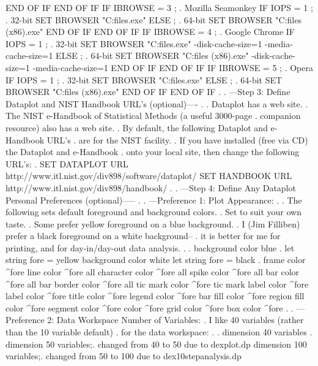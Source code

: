   END OF IF
END OF IF
IF IBROWSE = 3  ; . Mozilla Seamonkey
   IF IOPS = 1  ; . 32-bit
     SET BROWSER "C:\program files\SeaMonkey\seamonkey.exe"
   ELSE         ; . 64-bit
     SET BROWSER "C:\program files (x86)\SeaMonkey\seamonkey.exe"
   END OF IF
END OF IF
IF IBROWSE = 4  ; . Google Chrome
   IF IOPS = 1  ; . 32-bit
     SET BROWSER "C:\program files\Google\Chrome\Application\chrome.exe" -disk-cache-size=1 -media-cache-size=1
   ELSE         ; . 64-bit
     SET BROWSER "C:\program files (x86)\Google\Chrome\Application\chrome.exe" -disk-cache-size=1 -media-cache-size=1
   END OF IF
END OF IF
IF IBROWSE = 5  ; . Opera
   IF IOPS = 1  ; . 32-bit
     SET BROWSER "C:\program files\Opera\opera.exe"
   ELSE         ; . 64-bit
     SET BROWSER "C:\program files (x86)\Opera\opera.exe"
   END OF IF
END OF IF
.
. ---Step 3: Define Dataplot and NIST Handbook URL's (optional)----
.
. Dataplot has a web site.
. The NIST e-Handbook of Statistical Methods (a useful 3000-page
. companion resource) also has a web site.
. By default, the following Dataplot and e-Handbook URL's
. are for the NIST facility.
. If you have installed (free via CD) the Dataplot and e-Handbook
. onto your local site, then change the following URL's:
.
SET DATAPLOT URL http://www.itl.nist.gov/div898/software/dataplot/
SET HANDBOOK URL http://www.itl.nist.gov/div898/handbook/
.
. ---Step 4: Define Any Dataplot Personal Preferences (optional)-----
.
. ---Preference 1: Plot Appearance:
.
. The following sets default foreground and background colors.
. Set to suit your own taste.
. Some prefer yellow foreground on a blue background.
. I (Jim Filliben) prefer a black foreground on a white background--
. it is better for me for printing, and for day-in/day-out data analysis.
.
     . background color blue
     . let string fore = yellow
     background color white
     let string fore = black
     .
     frame color ^fore
     line color ^fore all
     character color ^fore all
     spike color ^fore all
     bar color ^fore all
     bar border color ^fore all
     tic mark color ^fore
     tic mark label color ^fore
     label color ^fore
     title color ^fore
     legend color ^fore
     bar fill color ^fore
     region fill color ^fore
     segment color ^fore
     color ^fore
     grid color ^fore
     box color ^fore
.
. ---Preference 2: Data Workspace Number of Variables:
.    I like 40 variables (rather than the 10 variable default)
.    for the data workspace:
.
.    dimension 40 variables
.    dimension 50 variables;. changed from 40 to 50 due to dexplot.dp
     dimension 100 variables;. changed from 50 to 100 due to dex10stepanalysis.dp
